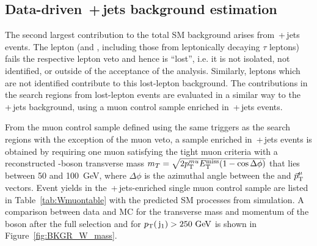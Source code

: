 \subsection{Data-driven \wlnubr{}\,+\,jets background estimation}
\label{sec:wjets}

The second largest contribution to the total SM background arises from \wlnubr{}\,+\,jets events. 
The lepton (\e and \mu, including those from leptonically decaying $\tau$ leptons) fails the respective lepton veto
and hence is ``lost'', i.e. it is not isolated, not identified, or outside of the acceptance of 
the analysis. 
Similarly, \tauh leptons which are not identified contribute to this lost-lepton background.
The contributions in the search regions from lost-lepton events are evaluated in a similar way to the \znunubr{}\,+\,jets background, using a muon control sample enriched in \wmunubr{}\,+\,jets events.

From the muon control sample defined using the same triggers as the search regions with the exception of the muon veto, a sample enriched in \wmunubr{}\,+\,jets events is obtained by requiring one muon satisfying the tight muon criteria with a reconstructed \W{}-boson transverse mass $m_{T} = \sqrt{2 p_{\text{T}}^{mu} E_{\text{T}}^{\text{miss}} (1 - \cos{\Delta \phi}) }$ that lies between 50 and 100~GeV, where $\Delta\phi$ is the azimuthal angle between the \metvmu and $\vec{p}_{\text{T}}^{\mu}$ vectors.
Event yields in the \wmunubr{}\,+\,jets-enriched single muon control sample are listed in Table~\ref{tab:Wmuontable} with the predicted SM processes from simulation. 
A comparison between data and MC for the transverse mass and momentum of the \W{} boson after the full selection and for $p_{\text{T}}(\,\mathrm{j}_1) > 250~\mathrm{GeV}$ is shown in Figure~\ref{fig:BKGR_W_mass}.

